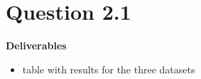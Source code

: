 \section*{Question 2.1}


\textbf{Deliverables}
\begin{itemize}
	\item table with results for the three datasets
\end{itemize}
